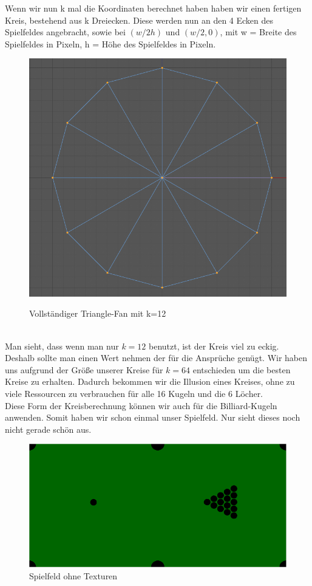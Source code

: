 	Wenn wir nun k mal die Koordinaten berechnet haben haben wir einen fertigen Kreis, bestehend aus k Dreiecken. Diese werden nun an den 4 Ecken des Spielfeldes angebracht, sowie bei $(w /2 h)$ und $(w/2, 0)$, mit w = Breite des Spielfeldes in Pixeln, h = Höhe des Spielfeldes in Pixeln. \\
		\begin{figure}[h]
		\centering
		\caption{Vollständiger Triangle-Fan mit k=12}
		\includegraphics[width=\textwidth/2]{bilder/k12kreis.png} \\
	\end{figure} \\
	Man sieht, dass wenn man nur $k = 12 $ benutzt, ist der Kreis viel zu eckig. Deshalb sollte man einen Wert nehmen der für die Ansprüche genügt. Wir haben uns aufgrund der Größe unserer Kreise für $k=64$ entschieden um die besten Kreise zu erhalten. Dadurch bekommen wir die Illusion eines Kreises, ohne zu viele Ressourcen zu verbrauchen für alle 16 Kugeln und die 6 Löcher.\\
	Diese Form der Kreisberechnung können wir auch für die Billiard-Kugeln anwenden. Somit haben wir schon einmal unser Spielfeld. Nur sieht dieses noch nicht gerade schön aus. \\
	\begin{figure}[h]
		\caption{Spielfeld ohne Texturen}
			\includegraphics[width=\textwidth]{bilder/untextured_pool_low.png} 
	\end{figure}

